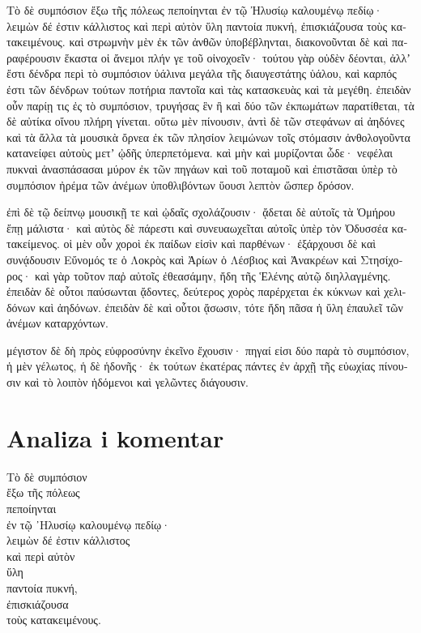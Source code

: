 {\large

\begin{greek}

\noindent Τὸ δὲ συμπόσιον ἔξω τῆς πόλεως πεποίηνται ἐν τῷ Ἠλυσίῳ καλουμένῳ πεδίῳ· λειμὼν δέ ἐστιν κάλλιστος καὶ περὶ αὐτὸν ὕλη παντοία πυκνή, ἐπισκιάζουσα τοὺς κατακειμένους. καὶ στρωμνὴν μὲν ἐκ τῶν ἀνθῶν ὑποβέβληνται, διακονοῦνται δὲ καὶ παραφέρουσιν ἕκαστα οἱ ἄνεμοι πλήν γε τοῦ οἰνοχοεῖν· τούτου γὰρ οὐδὲν δέονται, ἀλλʼ ἔστι δένδρα περὶ τὸ συμπόσιον ὑάλινα μεγάλα τῆς διαυγεστάτης ὑάλου, καὶ καρπός ἐστι τῶν δένδρων τούτων ποτήρια παντοῖα καὶ τὰς κατασκευὰς καὶ τὰ μεγέθη. ἐπειδὰν οὖν παρίῃ τις ἐς τὸ συμπόσιον, τρυγήσας ἓν ἢ καὶ δύο τῶν ἐκπωμάτων παρατίθεται, τὰ δὲ αὐτίκα οἴνου πλήρη γίνεται. οὕτω μὲν πίνουσιν, ἀντὶ δὲ τῶν στεφάνων αἱ ἀηδόνες καὶ τὰ ἄλλα τὰ μουσικὰ ὄρνεα ἐκ τῶν πλησίον λειμώνων τοῖς στόμασιν ἀνθολογοῦντα κατανείφει αὐτοὺς μετʼ ᾠδῆς ὑπερπετόμενα. καὶ μὴν καὶ μυρίζονται ὧδε· νεφέλαι πυκναὶ ἀνασπάσασαι μύρον ἐκ τῶν πηγάων καὶ τοῦ ποταμοῦ καὶ ἐπιστᾶσαι ὑπὲρ τὸ συμπόσιον ἠρέμα τῶν ἀνέμων ὑποθλιβόντων ὕουσι λεπτὸν ὥσπερ δρόσον.

\noindent ἐπὶ δὲ τῷ δείπνῳ μουσικῇ τε καὶ ᾠδαῖς σχολάζουσιν· ᾄδεται δὲ αὐτοῖς τὰ Ὁμήρου ἔπῃ μάλιστα· καὶ αὐτὸς δὲ πάρεστι καὶ συνευαωχεῖται αὐτοῖς ὑπὲρ τὸν Ὀδυσσέα κατακείμενος. οἱ μὲν οὖν χοροὶ ἐκ παίδων εἰσὶν καὶ παρθένων· ἐξάρχουσι δὲ καὶ συνᾴδουσιν Εὔνομός τε ὁ Λοκρὸς καὶ Ἀρίων ὁ Λέσβιος καὶ Ἀνακρέων καὶ Στησίχορος· καὶ γὰρ τοῦτον παῤ αὐτοῖς ἐθεασάμην, ἤδη τῆς Ἑλένης αὐτῷ διηλλαγμένης. ἐπειδὰν δὲ οὗτοι παύσωνται ᾄδοντες, δεύτερος χορὸς παρέρχεται ἐκ κύκνων καὶ χελιδόνων καὶ ἀηδόνων. ἐπειδὰν δὲ καὶ οὗτοι ᾄσωσιν, τότε ἤδη πᾶσα ἡ ὕλη ἐπαυλεῖ τῶν ἀνέμων καταρχόντων.

\noindent μέγιστον δὲ δὴ πρὸς εὐφροσύνην ἐκεῖνο ἔχουσιν· πηγαί εἰσι δύο παρὰ τὸ συμπόσιον, ἡ μὲν γέλωτος, ἡ δὲ ἡδονῆς· ἐκ τούτων ἑκατέρας πάντες ἐν ἀρχῇ τῆς εὐωχίας πίνουσιν καὶ τὸ λοιπὸν ἡδόμενοι καὶ γελῶντες διάγουσιν.

\end{greek}

}


\section*{Analiza i komentar}


{\large
\begin{greek}
\noindent Τὸ δὲ συμπόσιον \\
 \tabto{2em} ἔξω τῆς πόλεως \\
πεποίηνται \\
\tabto{2em} ἐν τῷ ᾿Ηλυσίῳ καλουμένῳ πεδίῳ· \\
\tabto{4em} λειμὼν δέ ἐστιν κάλλιστος \\
\tabto{4em} καὶ περὶ αὐτὸν \\
\tabto{4em} ὕλη \\
\tabto{6em} παντοία πυκνή, \\
\tabto{6em} ἐπισκιάζουσα \\
\tabto{8em} τοὺς κατακειμένους. \\

\end{greek}
}

